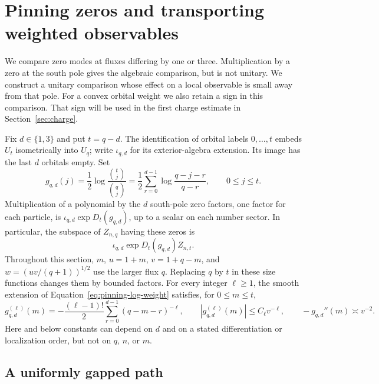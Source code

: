 \section{Pinning zeros and transporting weighted observables}
\label{sec:pinning}

We compare zero modes at fluxes differing by one or three.  Multiplication
by a zero at the south pole gives the algebraic comparison, but is not
unitary.  We construct a unitary comparison whose effect on a local
observable is small away from that pole.  For a convex orbital weight we
also retain a sign in this comparison.  That sign will be used in the first
charge estimate in Section~\ref{sec:charge}.

Fix $d\in\{1,3\}$ and put $t=q-d$.  The identification of orbital labels
$0,\ldots,t$ embeds $U_t$ isometrically into $U_q$; write $\iota_{q,d}$ for
its exterior-algebra extension.  Its image has the last $d$ orbitals empty.
Set
\begin{equation}
 g_{q,d}(j)=\frac12\log\frac{\binom{t}{j}}{\binom qj}
 =\frac12\sum_{r=0}^{d-1}
       \log\frac{q-j-r}{q-r},\qquad 0\le j\le t.
 \label{eq:pinning-log-weight}
\end{equation}
Multiplication of a polynomial by the $d$ south-pole zero factors, one
factor for each particle, is $\iota_{q,d}\exp D_t(g_{q,d})$, up to a scalar
on each number sector.  In particular, the subspace of $Z_{n,q}$ having
these zeros is
\begin{equation}
 \iota_{q,d}\exp D_t(g_{q,d}) Z_{n,t}.
 \label{eq:pinning-kernel-identification}
\end{equation}
Throughout this section, $m$, $u=1+m$, $v=1+q-m$, and
$w=(uv/(q+1))^{1/2}$ use the larger flux $q$.  Replacing $q$ by $t$ in
these size functions changes them by bounded factors.  For every integer
$\ell\ge1$, the smooth extension of Equation~\eqref{eq:pinning-log-weight}
satisfies, for $0\le m\le t$,
\begin{equation}
 g_{q,d}^{(\ell)}(m)
 =-\frac{(\ell-1)!}{2}\sum_{r=0}^{d-1}(q-m-r)^{-\ell},
 \qquad |g_{q,d}^{(\ell)}(m)|\le C_\ell v^{-\ell},
 \qquad -g_{q,d}''(m)\asymp v^{-2}.
 \label{eq:pinning-derivatives}
\end{equation}
Here and below constants can depend on $d$ and on a stated differentiation
or localization order, but not on $q$, $n$, or $m$.

\subsection{A uniformly gapped path}


